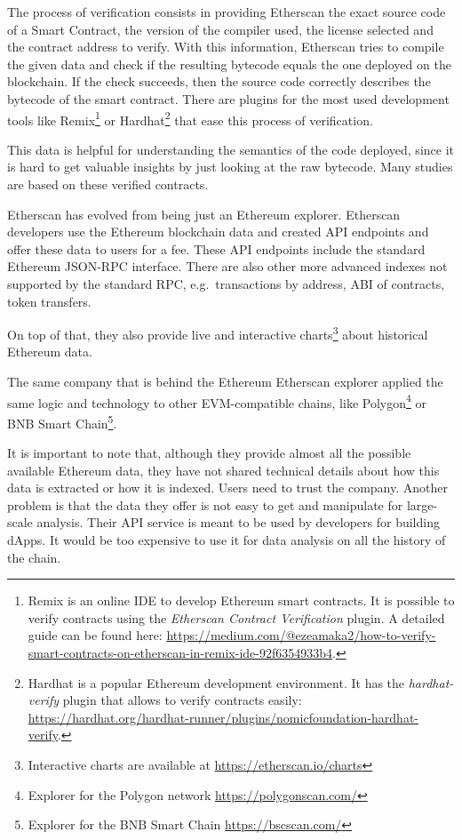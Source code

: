 The process of verification consists in providing Etherscan the exact source code of a Smart Contract, the version of the compiler used, the license selected and the contract address to verify. With this information, Etherscan tries to compile the given data and check if the resulting bytecode equals the one deployed on the blockchain. If the check succeeds, then the source code correctly describes the bytecode of the smart contract. There are plugins for the most used development tools like Remix\footnote{Remix is an online IDE to develop Ethereum smart contracts. It is possible to verify contracts using the {\it Etherscan Contract Verification} plugin. A detailed guide can be found here: \url{https://medium.com/@ezeamaka2/how-to-verify-smart-contracts-on-etherscan-in-remix-ide-92f6354933b4}.} or Hardhat\footnote{Hardhat is a popular Ethereum development environment. It has the \textit{hardhat-verify} plugin that allows to verify contracts easily: \url{https://hardhat.org/hardhat-runner/plugins/nomicfoundation-hardhat-verify}.} that ease this process of verification.

This data is helpful for understanding the semantics of the code deployed, since it is hard to get valuable insights by just looking at the raw bytecode. Many studies are based on these verified contracts.

Etherscan has evolved from being just an Ethereum explorer. Etherscan developers use the Ethereum blockchain data and created API endpoints and offer these data to users for a fee. These API endpoints include the standard Ethereum JSON-RPC interface. There are also other more advanced indexes not supported by the standard RPC, e.g.~transactions by address, ABI of contracts, token transfers.

On top of that, they also provide live and interactive charts\footnote{Interactive charts are available at \url{https://etherscan.io/charts}} about historical Ethereum data.

The same company that is behind the Ethereum Etherscan explorer applied the same logic and technology to other EVM-compatible chains, like Polygon\footnote{Explorer for the Polygon network \url{https://polygonscan.com/}} or BNB Smart Chain\footnote{Explorer for the BNB Smart Chain \url{https://bscscan.com/}}.

It is important to note that, although they provide almost all the possible available Ethereum data, they have not shared technical details about how this data is extracted or how it is indexed. Users need to trust the company. Another problem is that the data they offer is not easy to get and manipulate for large-scale analysis. Their API service is meant to be used by developers for building dApps. It would be too expensive to use it for data analysis on all the history of the chain. 

